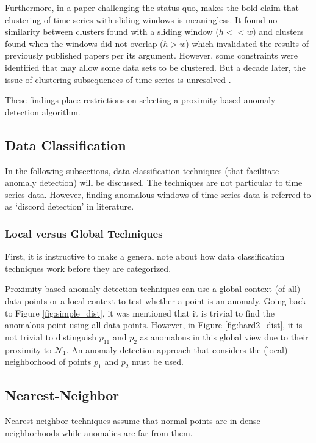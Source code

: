 Furthermore, in a paper challenging the status quo, \cite{Keogh2004} makes the bold claim that clustering of time series with sliding windows is meaningless. It found no similarity between clusters found with a sliding window ($h<<w$) and clusters found when the windows did not overlap ($h>w$) which invalidated the results of previously published papers per its argument. However, some constraints were identified that may allow some data sets to be clustered. But a decade later, the issue of clustering subsequences of time series is unresolved \cite{Zolhavarieh2014}.

These findings place restrictions on selecting a proximity-based anomaly detection algorithm.


\subsection{Data Classification}

In the following subsections, data classification techniques (that facilitate anomaly detection) will be discussed. The techniques are not particular to time series data. However, finding anomalous windows of time series data is referred to as `discord detection' in literature.

\subsubsection{Local versus Global Techniques}

First, it is instructive to make a general note about how data classification techniques work before they are categorized.

Proximity-based anomaly detection techniques can use a global context (of all) data points or a local context to test whether a point is an anomaly. Going back to Figure \ref{fig:simple_dist}, it was mentioned that it is trivial to find the anomalous point using all data points. However, in Figure \ref{fig:hard2_dist}, it is not trivial to distinguish $p_11$ and $p_2$ as anomalous in this global view due to their proximity to $\mathcal{N}_1$. An anomaly detection approach that considers the (local) neighborhood of points $p_1$ and $p_2$ must be used.

\subsection{Nearest-Neighbor}

Nearest-neighbor techniques assume that normal points are in dense neighborhoods while anomalies are far from them.

